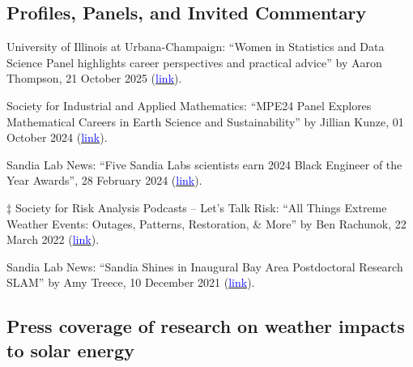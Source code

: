\documentclass{article}[12pt]
\begin{document}
	\subsection*{Profiles, Panels, and Invited Commentary}
	\begin{etaremune}[]
		
		\item University of Illinois at Urbana-Champaign: ``Women in Statistics and Data Science Panel highlights career perspectives and practical advice'' by Aaron Thompson, 21 October 2025 (\href{https://stat.illinois.edu/news/2025-10-21/women-statistics-and-data-science-panel-highlights-career-perspectives-and}{\textcolor{blue}{link}}).
		
		\item Society for Industrial and Applied Mathematics: ``MPE24 Panel Explores Mathematical Careers in Earth Science and Sustainability'' by Jillian Kunze, 01 October 2024 (\href{https://www.siam.org/publications/siam-news/articles/mpe24-panel-explores-mathematical-careers-in-earth-science-and-sustainability/}{\textcolor{blue}{link}}).
		
		\item Sandia Lab News: ``Five Sandia Labs scientists earn 2024 Black Engineer of the Year Awards'', 28 February 2024 (\href{https://newsreleases.sandia.gov/beya_2024/}{\textcolor{blue}{link}}).
		
		\item $\ddagger$ Society for Risk Analysis Podcasts -- Let's Talk Risk: ``All Things Extreme Weather Events: Outages, Patterns, Restoration, \& More'' by Ben Rachunok, 22 March 2022 (\href{https://societyriskanalysis.libsyn.com/all-things-extreme-weather-events-outages-patterns-restoration-more}{\textcolor{blue}{link}}).
		
		\item Sandia Lab News: ``Sandia Shines in Inaugural Bay Area Postdoctoral Research SLAM'' by Amy Treece, 10 December 2021 (\href{https://www.sandia.gov/labnews/2021/12/10/sandia-shines-in-inaugural-bay-area-postdoctoral-research-slam/}{\textcolor{blue}{link}}).
		
	\end{etaremune}
	
	
	\subsection*{Press coverage of research on weather impacts to solar energy}
	
\end{document}

